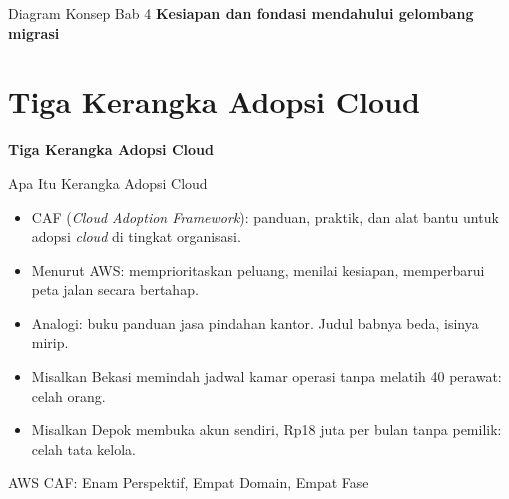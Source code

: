 \documentclass[aspectratio=169, table, 12pt]{beamer}
\begin{document}
\begin{frame}{{\Large Diagram Konsep Bab 4}}
  \centering
  {\small\bfseries Kesiapan dan fondasi mendahului gelombang migrasi}\par\medskip
\end{frame}

\section{Tiga Kerangka Adopsi Cloud}

\begin{frame}{\hfill}
  \centering
  \Huge{\textbf{Tiga Kerangka Adopsi Cloud}}
\end{frame}

\begin{frame}{Apa Itu Kerangka Adopsi Cloud}
  \begin{itemize}
    \item CAF (\textit{Cloud Adoption Framework}): panduan, praktik, dan alat bantu untuk
          adopsi \textit{cloud} di tingkat organisasi.
    \item Menurut AWS: memprioritaskan peluang, menilai kesiapan, memperbarui peta jalan
          secara bertahap.
    \item Analogi: buku panduan jasa pindahan kantor. Judul babnya beda, isinya mirip.
    \item Misalkan Bekasi memindah jadwal kamar operasi tanpa melatih 40 perawat: celah
          orang.
    \item Misalkan Depok membuka akun sendiri, Rp18 juta per bulan tanpa pemilik: celah
          tata kelola.
  \end{itemize}
\end{frame}

\begin{frame}{AWS CAF: Enam Perspektif, Empat Domain, Empat Fase}
  \centering
\end{frame}
\end{document}
